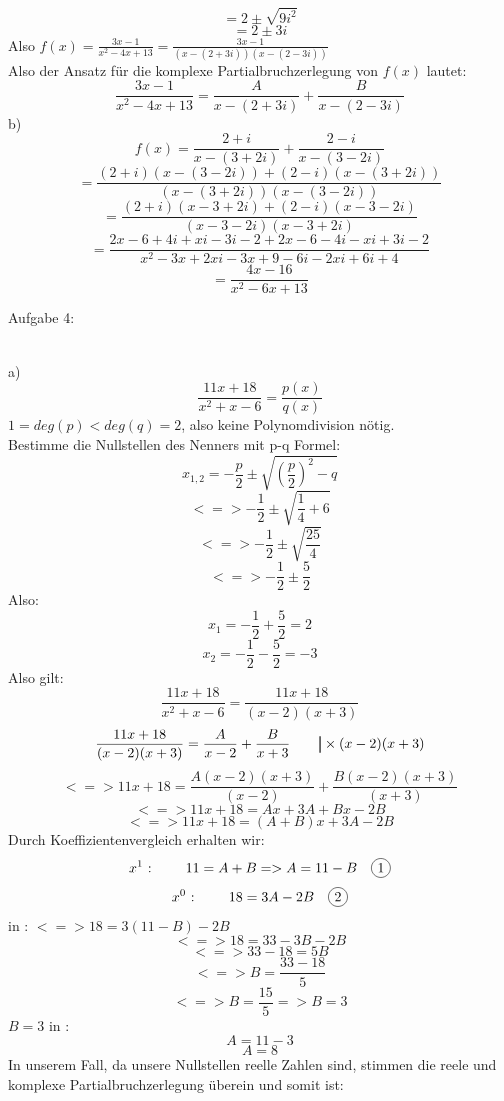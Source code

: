 \documentclass[11pt]{article}
\newcommand\mybar{\kern1pt\rule[-\dp\strutbox]{.8pt}{\baselineskip}\kern1pt}
\newcommand*\circled[1]{\tikz[baseline=(char.base)]{
            \node[shape=circle,draw,inner sep=2pt] (char) {#1};}}
\begin{document}
				$$=2 \pm \sqrt{9i^2}$$
				$$=2\pm 3i$$
				Also $f(x)=\frac{3x-1}{x^2-4x+13}=\frac{3x-1}{(x-(2+3i))(x-(2-3i))}$\\
				Also der Ansatz für die komplexe Partialbruchzerlegung von $f(x)$ lautet:
				$$\frac{3x-1}{x^2-4x+13}=\frac{A}{x-(2+3i)}+\frac{B}{x-(2-3i)}$$
			\indent b)\\
				$$f(x)=\frac{2+i}{x-(3+2i)}+\frac{2-i}{x-(3-2i)}$$
				$$=\frac{(2+i)(x-(3-2i))+(2-i)(x-(3+2i))}{(x-(3+2i))(x-(3-2i))}$$
				$$=\frac{(2+i)(x-3+2i)+(2-i)(x-3-2i)}{(x-3-2i)(x-3+2i)}$$
				$$=\frac{2x-6+4i+xi-3i-2+2x-6-4i-xi+3i-2}{x^2-3x+2xi-3x+9-6i-2xi+6i+4}$$
				$$=\frac{4x-16}{x^2-6x+13}$$
		\noindent \begin{Large}Aufgabe 4:\end{Large}\\[2pt]
			\indent a)\\
				$$\frac{11x+18}{x^2+x-6}=\frac{p(x)}{q(x)}$$
				$1=deg(p)<deg(q)=2$, also keine Polynomdivision nötig.\\
				Bestimme die Nullstellen des Nenners mit p-q Formel:\\
				$$x_{1,2}=-\frac{p}{2}\pm \sqrt{\left(\frac{p}{2}\right)^2-q}$$
				$$<=>-\frac{1}{2}\pm\sqrt{\frac{1}{4}+6}$$
				$$<=>-\frac{1}{2}\pm\sqrt{\frac{25}{4}}$$
				$$<=>-\frac{1}{2}\pm\frac{5}{2}$$
				Also:\\
				$$x_1=-\frac{1}{2}+\frac{5}{2}=2$$
				$$x_2=-\frac{1}{2}-\frac{5}{2}=-3$$
				Also gilt:\\
				$$\frac{11x+18}{x^2+x-6}=\frac{11x+18}{(x-2)(x+3)}$$
				$$\frac{11x+18}{(x-2)(x+3)}=\frac{A}{x-2}+\frac{B}{x+3} \hspace{20pt} \mybar \times (x-2)(x+3)$$
				$$<=>11x+18=\frac{A(x-2)(x+3)}{(x-2)}+\frac{B(x-2)(x+3)}{(x+3)}$$
				$$<=>11x+18=Ax+3A+Bx-2B$$
				$$<=>11x+18=(A+B)x+3A-2B$$
				Durch Koeffizientenvergleich erhalten wir:\\
				$$x^1 \mbox{ : } \hspace{20pt} 11=A+B=>A=11-B \hspace{10pt} \mbox{\circled{1}}$$
				$$x^0 \mbox{ : } \hspace{20pt} 18=3A-2B \hspace{10pt} \mbox{\circled{2}}$$
				\indent \circled{1} in \circled{2}: \hspace{50pt} $<=>18=3(11-B)-2B$
				$$<=>18=33-3B-2B$$
				$$<=>33-18=5B$$
				$$<=>B=\frac{33-18}{5}$$
				$$<=>B=\frac{15}{5}=>B=3$$
				\indent $B=3$ in \circled{1}:\\
				$$A=11-3$$
				$$A=8$$
				In unserem Fall, da unsere Nullstellen reelle Zahlen sind, stimmen die reele und komplexe Partialbruchzerlegung überein und somit ist:\\
\end{document}
